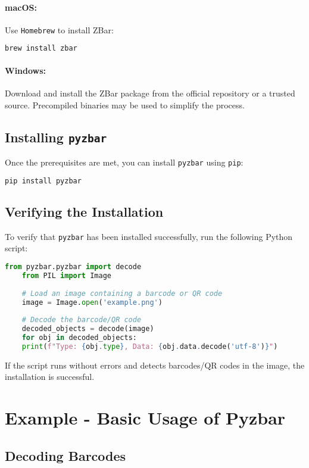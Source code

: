 \paragraph{macOS:}
Use \texttt{Homebrew} to install ZBar:
\begin{lstlisting}[language=bash]
	brew install zbar
\end{lstlisting}

\paragraph{Windows:}
Download and install the ZBar package from the official repository or a trusted source. Precompiled binaries may be used to simplify the process.

\subsection{Installing \texttt{pyzbar}}

Once the prerequisites are met, you can install \texttt{pyzbar} using \texttt{pip}:
\begin{lstlisting}[language=bash]
	pip install pyzbar
\end{lstlisting}

\subsection{Verifying the Installation}

To verify that \texttt{pyzbar} has been installed successfully, run the following Python script:
\begin{lstlisting}[language=Python]
	from pyzbar.pyzbar import decode
	from PIL import Image
	
	# Load an image containing a barcode or QR code
	image = Image.open('example.png')
	
	# Decode the barcode/QR code
	decoded_objects = decode(image)
	for obj in decoded_objects:
	print(f"Type: {obj.type}, Data: {obj.data.decode('utf-8')}")
\end{lstlisting}
If the script runs without errors and detects barcodes/QR codes in the image, the installation is successful.\cite{pyzbarpypi:2024}

\section{Example - Basic Usage of Pyzbar}

\subsection{Decoding Barcodes}

